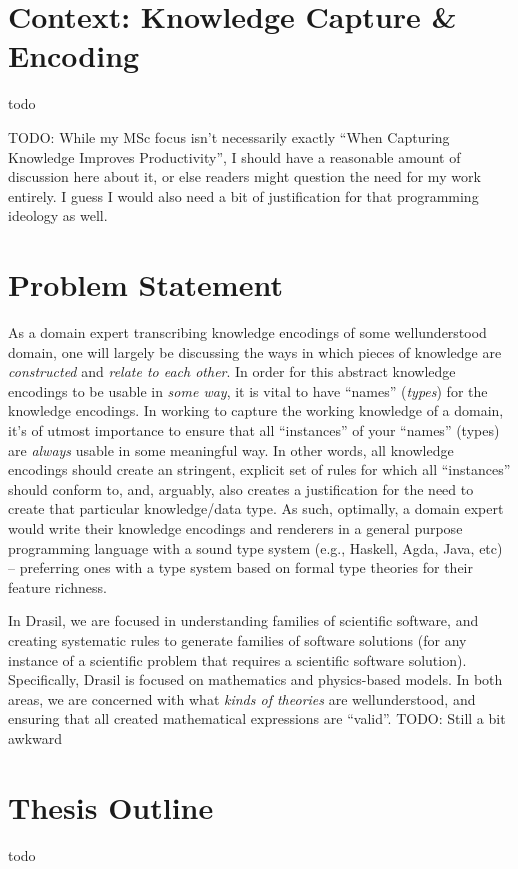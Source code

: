 \section{Context: Knowledge Capture \& Encoding}
todo

TODO: While my MSc focus isn't necessarily exactly ``When Capturing Knowledge Improves Productivity'', I should have a reasonable amount of discussion here about it, or else readers might question the need for my work entirely. I guess I would also need a bit of justification for that programming ideology as well.

\section{Problem Statement}
As a domain expert transcribing knowledge encodings of some well\-understood domain, one will largely be discussing the ways in which pieces of knowledge are \textit{constructed} and \textit{relate to each other}.
In order for this abstract knowledge encodings to be usable in \textit{some way}, it is vital to have ``names'' (\textit{types}) for the knowledge encodings.
In working to capture the working knowledge of a domain, it's of utmost importance to ensure that all ``instances'' of your ``names'' (types) are \textit{always} usable in some meaningful way.
In other words, all knowledge encodings should create an stringent, explicit set of rules for which all ``instances'' should conform to, and, arguably, also creates a justification for the need to create that particular knowledge/data type. 
As such, optimally, a domain expert would write their knowledge encodings and renderers in a general purpose programming language with a sound type system (e.g., Haskell, Agda, Java, etc) -- preferring ones with a type system based on formal type theories for their feature richness.

In Drasil, we are focused in understanding families of scientific software, and creating systematic rules to generate families of software solutions (for any instance of a scientific problem that requires a scientific software solution).
Specifically, Drasil is focused on mathematics and physics-based models.
In both areas, we are concerned with what \textit{kinds of theories} are well\-understood, and ensuring that all created mathematical expressions are ``valid''. TODO: Still a bit awkward

\section{Thesis Outline}
todo
